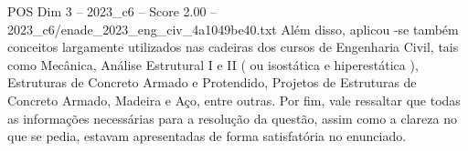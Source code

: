 \begin{textsample}{POS Dim 3 – 2023\_c6 – Score 2.00 – 2023\_c6/enade\_2023\_eng\_civ\_4a1049be40.txt}
Além disso, aplicou -se também conceitos largamente utilizados nas cadeiras dos cursos de Engenharia Civil, tais como Mecânica, Análise Estrutural I e II ( ou isostática e hiperestática ), Estruturas de Concreto Armado e Protendido, Projetos de Estruturas de Concreto Armado, Madeira e Aço, entre outras.
Por fim, vale ressaltar que todas as informações necessárias para a resolução da questão, assim como a clareza no que se pedia, estavam apresentadas de forma satisfatória no enunciado.

\end{textsample}
